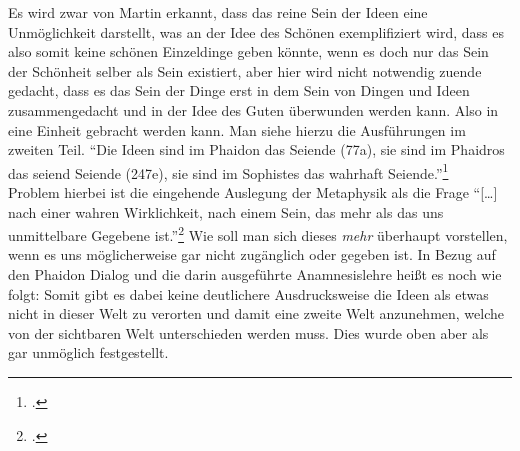 Es wird zwar von Martin erkannt, dass das reine Sein der Ideen eine Unmöglichkeit darstellt, was an der Idee des Schönen exemplifiziert wird, dass es also somit keine schönen Einzeldinge geben könnte, wenn es doch nur das Sein der Schönheit selber als Sein existiert, aber hier wird nicht notwendig zuende gedacht, dass es das Sein der Dinge erst in dem Sein von Dingen und Ideen zusammengedacht und in der Idee des Guten überwunden werden kann. Also in eine Einheit gebracht werden kann. Man siehe hierzu die Ausführungen im zweiten Teil.
\enquote{Die Ideen sind im Phaidon das Seiende (77a), sie sind im Phaidros das seiend Seiende (247e), sie sind im Sophistes das wahrhaft Seiende.}\footcite[vgl.][S. 131]{Martin73}\\
Problem hierbei ist die eingehende Auslegung der Metaphysik als die Frage \enquote{[\dots] nach einer wahren Wirklichkeit, nach einem Sein, das mehr als das uns unmittelbare Gegebene ist.}\footcite[vgl.][S. 17]{DisseMetaphysik} Wie soll man sich dieses \emph{mehr} überhaupt vorstellen, wenn es uns möglicherweise gar nicht zugänglich oder gegeben ist.
In Bezug auf den Phaidon Dialog und die darin ausgeführte Anamnesislehre heißt es noch wie folgt:
Somit gibt es dabei keine deutlichere Ausdrucksweise die Ideen als etwas nicht in dieser Welt zu verorten und damit eine zweite Welt anzunehmen, welche von der sichtbaren Welt unterschieden werden muss. Dies wurde oben aber als gar unmöglich festgestellt.
